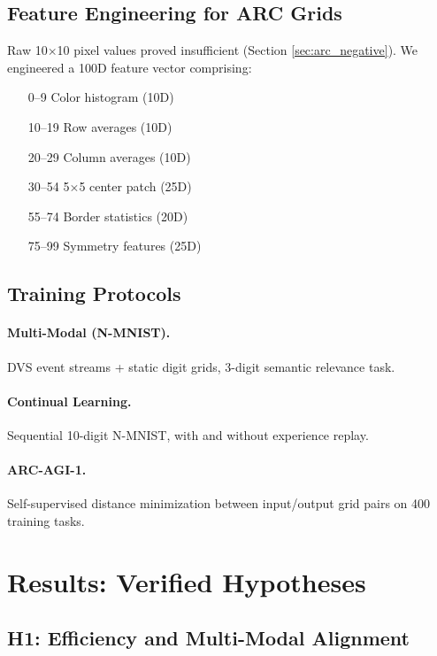 \documentclass[11pt,a4paper]{article}
\begin{document}
\subsection{Feature Engineering for ARC Grids}

Raw 10$\times$10 pixel values proved insufficient (Section \ref{sec:arc_negative}). We engineered a 100D feature vector comprising:
\begin{itemize}
    \item[0--9] Color histogram (10D)
    \item[10--19] Row averages (10D)
    \item[20--29] Column averages (10D)
    \item[30--54] 5$\times$5 center patch (25D)
    \item[55--74] Border statistics (20D)
    \item[75--99] Symmetry features (25D)
\end{itemize}

\subsection{Training Protocols}

\paragraph{Multi-Modal (N-MNIST).} DVS event streams + static digit grids, 3-digit semantic relevance task.
\paragraph{Continual Learning.} Sequential 10-digit N-MNIST, with and without experience replay.
\paragraph{ARC-AGI-1.} Self-supervised distance minimization between input/output grid pairs on 400 training tasks.

\section{Results: Verified Hypotheses}
\label{sec:positive}

\subsection{H1: Efficiency and Multi-Modal Alignment}
\end{document}
